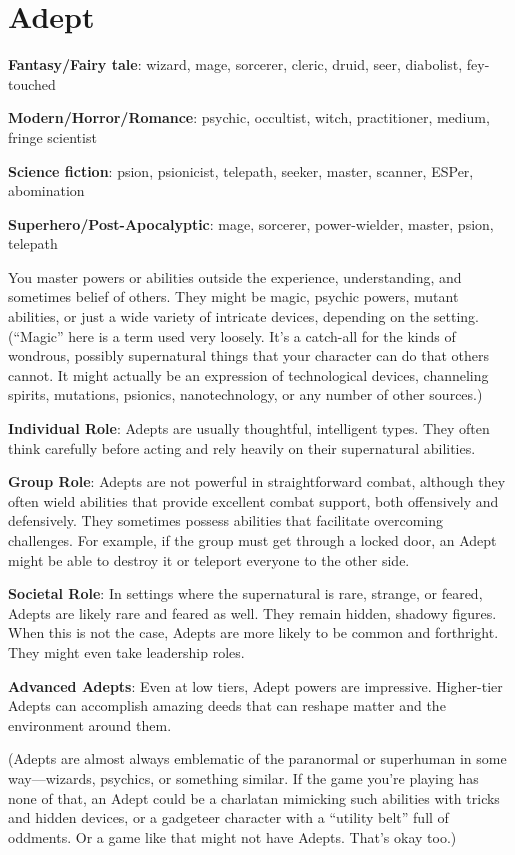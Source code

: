 \section{Adept}
\textbf{Fantasy/Fairy tale}: wizard, mage, sorcerer, cleric, druid, seer, diabolist, fey-touched

\textbf{Modern/Horror/Romance}: psychic, occultist, witch, practitioner, medium, fringe scientist

\textbf{Science fiction}: psion, psionicist, telepath, seeker, master, scanner, ESPer, abomination

\textbf{Superhero/Post-Apocalyptic}: mage, sorcerer, power-wielder, master, psion, telepath

You master powers or abilities outside the experience, understanding, and sometimes belief of others. They might be magic, psychic powers, mutant abilities, or just a wide variety of intricate devices, depending on the setting. (“Magic” here is a term used very loosely. It’s a catch-all for the kinds of wondrous, possibly supernatural things that your character can do that others cannot. It might actually be an expression of technological devices, channeling spirits, mutations, psionics, nanotechnology, or any number of other sources.)

\textbf{Individual Role}: Adepts are usually thoughtful, intelligent types. They often think carefully before acting and rely heavily on their supernatural abilities.

\textbf{Group Role}: Adepts are not powerful in straightforward combat, although they often wield abilities that provide excellent combat support, both offensively and defensively. They sometimes possess abilities that facilitate overcoming challenges. For example, if the group must get through a locked door, an Adept might be able to destroy it or teleport everyone to the other side. 

\textbf{Societal Role}: In settings where the supernatural is rare, strange, or feared, Adepts are likely rare and feared as well. They remain hidden, shadowy figures. When this is not the case, Adepts are more likely to be common and forthright. They might even take leadership roles.

\textbf{Advanced Adepts}: Even at low tiers, Adept powers are impressive. Higher-tier Adepts can accomplish amazing deeds that can reshape matter and the environment around them.

(Adepts are almost always emblematic of the paranormal or superhuman in some way—wizards, psychics, or something similar. If the game you’re playing has none of that, an Adept could be a charlatan mimicking such abilities with tricks and hidden devices, or a gadgeteer character with a “utility belt” full of oddments. Or a game like that might not have Adepts. That’s okay too.)

